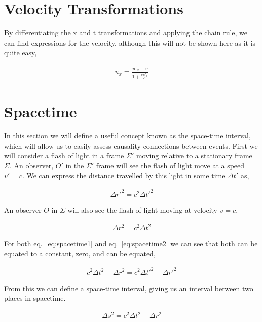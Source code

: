 \documentclass[11pt]{amsart}
\begin{document}
\section{Velocity Transformations}

By differentiating the x and t transformations and applying the chain rule, we can find expressions for the velocity, although this will not be shown here as it is quite easy,

\begin{align*}
u_x = \frac{u'_x + v}{1 + \frac{v u'_x}{c^2}}
\end{align*}

\section{Spacetime}

In this section we will define a useful concept known as the space-time interval, which will allow us to easily assess causality connections between events. First we will consider a flash of light in a frame $\Sigma'$ moving relative to a stationary frame $\Sigma$. An observer, $O'$ in the $\Sigma'$ frame will see the flash of light move at a speed $v' = c$. We can express the distance travelled by this light in some time $\Delta t'$ as,

\begin{align}
  \label{eq:spacetime1}
  \Delta r'^2 = c^2 \Delta t'^2
\end{align}

An observer $O$ in $\Sigma$ will also see the flash of light moving at velocity $v = c$,

\begin{align}
  \label{eq:spacetime2}
  \Delta r^2 = c^2 \Delta t^2
\end{align}

For both eq.~\ref{eq:spacetime1} and eq.~\ref{eq:spacetime2} we can see that both can be equated to a constant, zero, and can be equated,

\begin{align*}
  c^2 \Delta t^2 - \Delta r^2 = c^2 \Delta t'^2 - \Delta r'^2
\end{align*}

From this we can define a space-time interval, giving us an interval between two places in spacetime.

\begin{align*}
  \Delta s^2 = c^2 \Delta t^2 - \Delta r^2
\end{align*}
\end{document}
